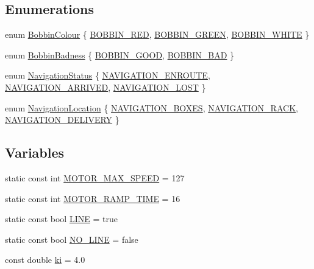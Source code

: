 \subsection*{Enumerations}
\begin{DoxyCompactItemize}
\item 
enum \hyperlink{namespaceIDP_a6efd2cca14c0dae1c6458714ce0218df}{BobbinColour} \{ \hyperlink{namespaceIDP_a6efd2cca14c0dae1c6458714ce0218dfa1bbb59488c1d089eefb9b54146bcdb26}{BOBBIN\_\-RED}, 
\hyperlink{namespaceIDP_a6efd2cca14c0dae1c6458714ce0218dfa047d7c5fcd5669f1a819d05fb5319f0b}{BOBBIN\_\-GREEN}, 
\hyperlink{namespaceIDP_a6efd2cca14c0dae1c6458714ce0218dfa8f427bfb1c335650a7ada595e1607d00}{BOBBIN\_\-WHITE}
 \}
\item 
enum \hyperlink{namespaceIDP_adf12b2c1e1c228810b18c34a3c88c32d}{BobbinBadness} \{ \hyperlink{namespaceIDP_adf12b2c1e1c228810b18c34a3c88c32dafdc1b8b5a9d849fd99ac2ae438b632dd}{BOBBIN\_\-GOOD}, 
\hyperlink{namespaceIDP_adf12b2c1e1c228810b18c34a3c88c32da6cb4993a316e9d4dc9836d3d990fd0f6}{BOBBIN\_\-BAD}
 \}
\item 
enum \hyperlink{namespaceIDP_a1a96e566e4d675fdf20780cc96d92283}{NavigationStatus} \{ \hyperlink{namespaceIDP_a1a96e566e4d675fdf20780cc96d92283a9f52fe7970aefcb1b74e9aea3798f39d}{NAVIGATION\_\-ENROUTE}, 
\hyperlink{namespaceIDP_a1a96e566e4d675fdf20780cc96d92283ab9e83c995cb23a5782b23b198dcbabcb}{NAVIGATION\_\-ARRIVED}, 
\hyperlink{namespaceIDP_a1a96e566e4d675fdf20780cc96d92283ad75d1c5522e0a38dbe62266912d411ba}{NAVIGATION\_\-LOST}
 \}
\item 
enum \hyperlink{namespaceIDP_ab9c412f0fd539b5d70385066c30465a0}{NavigationLocation} \{ \hyperlink{namespaceIDP_ab9c412f0fd539b5d70385066c30465a0a0cfb642ce5e4133706998843eb3c8da1}{NAVIGATION\_\-BOXES}, 
\hyperlink{namespaceIDP_ab9c412f0fd539b5d70385066c30465a0af1bde0912725a75705d0fb74637f20c1}{NAVIGATION\_\-RACK}, 
\hyperlink{namespaceIDP_ab9c412f0fd539b5d70385066c30465a0a10e09a3f2969d951f0dc233cb76eb4bf}{NAVIGATION\_\-DELIVERY}
 \}
\end{DoxyCompactItemize}
\subsection*{Variables}
\begin{DoxyCompactItemize}
\item 
static const int \hyperlink{namespaceIDP_a4ead0b21ad2c507b542445695182d4cd}{MOTOR\_\-MAX\_\-SPEED} = 127
\item 
static const int \hyperlink{namespaceIDP_ab3a00a6cc8a6dba271e38d337daf4703}{MOTOR\_\-RAMP\_\-TIME} = 16
\item 
static const bool \hyperlink{namespaceIDP_a559427fa7c37f2edc0a43a4b793c4fdc}{LINE} = true
\item 
static const bool \hyperlink{namespaceIDP_a5ea027b77276a637783f68955303b9b8}{NO\_\-LINE} = false
\item 
const double \hyperlink{namespaceIDP_aa2b933f600179026dbca5d8bc63c3baf}{ki} = 4.0
\end{DoxyCompactItemize}


